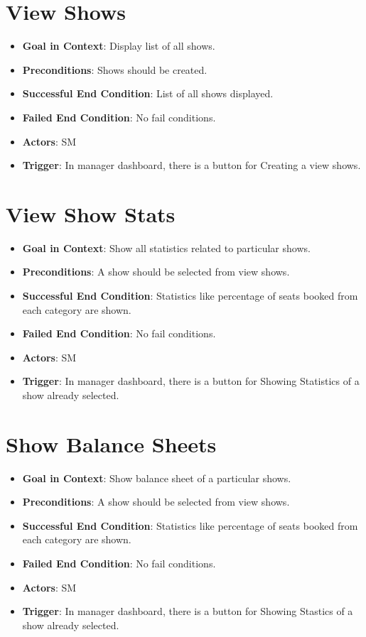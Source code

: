 \documentclass{scrreprt}
\begin{document}
\section{View Shows}
\begin{itemize}
\item \textbf{Goal in Context}: Display list of all shows.
\item \textbf{Preconditions}: Shows should be created.
\item \textbf{Successful End Condition}: List of all shows displayed.
\item \textbf{Failed End Condition}: No fail conditions.
\item \textbf{Actors}: SM
\item \textbf{Trigger}: In manager dashboard, there is a button for Creating a view shows.
\end{itemize}

\section{View Show Stats}
\begin{itemize}
\item \textbf{Goal in Context}: Show all statistics related to particular shows.
\item \textbf{Preconditions}: A show should be selected from view shows.
\item \textbf{Successful End Condition}: Statistics like percentage of seats booked from each category are shown.
\item \textbf{Failed End Condition}: No fail conditions.
\item \textbf{Actors}: SM
\item \textbf{Trigger}: In manager dashboard, there is a button for Showing Statistics of a show already selected.
\end{itemize}

\section{Show Balance Sheets}
\begin{itemize}
\item \textbf{Goal in Context}: Show balance sheet of a particular shows.
\item \textbf{Preconditions}: A show should be selected from view shows.
\item \textbf{Successful End Condition}: Statistics like percentage of seats booked from each category are shown.
\item \textbf{Failed End Condition}: No fail conditions.
\item \textbf{Actors}: SM
\item \textbf{Trigger}: In manager dashboard, there is a button for Showing Stastics of a show already selected.
\end{itemize}
\end{document}
